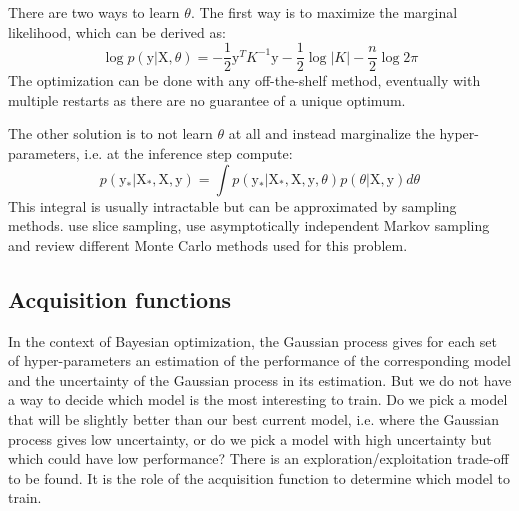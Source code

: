 There are two ways to learn $\theta$. The first way is to maximize the marginal likelihood, which can be derived as:  
\begin{equation}
	\log p\left(\mathrm{y} | \mathrm{X}, \theta \right) = - \frac{1}{2} \mathrm{y}^T K^{-1} \mathrm{y} - \frac{1}{2} \log |K| - \frac{n}{2} \log 2 \pi
\end{equation}
The optimization can be done with any off-the-shelf method, eventually with multiple restarts as there are no guarantee of a unique optimum. 

The other solution is to not learn $\theta$ at all and instead marginalize the hyper-parameters, i.e. at the inference step compute:
\begin{equation}
    p\left( \mathrm{y_*} | \mathrm{X_*}, \mathrm{X}, \mathrm{y} \right)
    = \int p\left( \mathrm{y_*} | \mathrm{X_*}, \mathrm{X}, \mathrm{y}, \theta \right) p \left( \theta | \mathrm{X}, \mathrm{y} \right) d\theta
\end{equation}
This integral is usually intractable but can be approximated by sampling methods. \textcite{murray2010NIPS} use slice sampling, \textcite{garbuno2016CSDA} use asymptotically independent Markov sampling and \textcite{titsias2011} review different Monte Carlo methods used for this problem.

\subsection{Acquisition functions}
\label{ssec:acqfunc}

In the context of Bayesian optimization, the Gaussian process gives for each set of hyper-parameters an estimation of the performance of the corresponding model and the uncertainty of the Gaussian process in its estimation. But we do not have a way to decide which model is the most interesting to train. Do we pick a model that will be slightly better than our best current model, i.e. where the Gaussian process gives low uncertainty, or do we pick a model with high uncertainty but which could have low performance? There is an exploration/exploitation trade-off to be found. It is the role of the acquisition function to determine which model to train.

